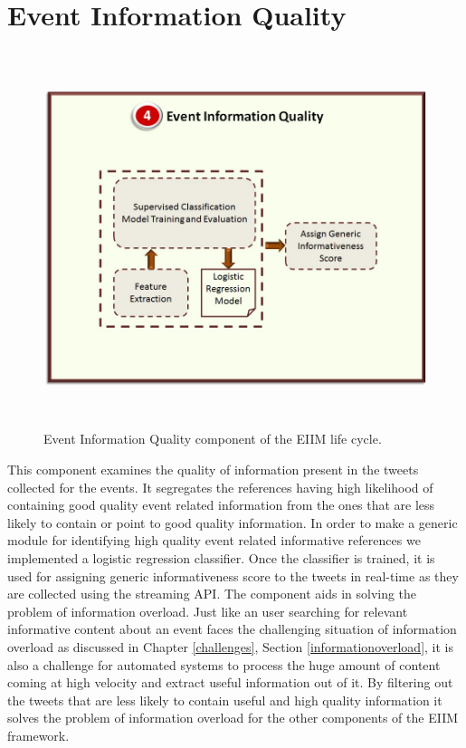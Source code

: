 \section{Event Information Quality\label{eventinfoquality}}

\begin{figure}[htbp]
  \caption{Event Information Quality component of the EIIM life cycle.}
  \centering
    \includegraphics[width=14cm,height=11cm]{Figures/EIIMComponents/EventInformationQuality.jpg}
\end{figure}

This component examines the quality of information present in the tweets collected for the events. It segregates the references having high likelihood of containing good quality event related information from the ones that are less likely to contain or point to good quality information. In order to make a generic module for identifying high quality event related informative references we implemented a logistic regression classifier. Once the classifier is trained, it is used for assigning generic informativeness score to the tweets in real-time as they are collected using the streaming API. The component aids in solving the problem of information overload. Just like an user searching for relevant informative content about an event faces the challenging situation of information overload as discussed in Chapter \ref{challenges}, Section \ref{informationoverload}, it is also a challenge for automated systems to process the huge amount of content coming at high velocity and extract useful information out of it. By filtering out the tweets that are less likely to contain useful and high quality  information it solves the problem of information overload for the other components of the EIIM framework. 

